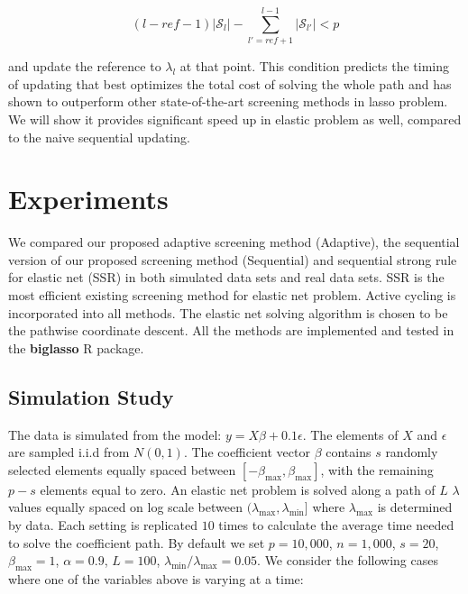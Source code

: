 \begin{equation}
    (l-ref-1)|\mathcal{S}_{l}|-\sum_{l'=ref+1}^{l-1}|\mathcal{S}_{l'}|<p
\end{equation}

and update the reference to $\lambda_l$ at that point. This condition predicts the timing of updating that best optimizes the total cost of solving the whole path and has shown to outperform other state-of-the-art screening methods in lasso problem. We will show it provides significant speed up in elastic problem as well, compared to the naive sequential updating.

\section{Experiments}

We compared our proposed adaptive screening method (Adaptive), the sequential version of our proposed screening method (Sequential) and sequential strong rule for elastic net (SSR) in both simulated data sets and real data sets. SSR is the most efficient existing screening method for elastic net problem. Active cycling is incorporated into all methods. The elastic net solving algorithm is chosen to be the pathwise coordinate descent. All the methods are implemented and tested in the \textbf{biglasso} R package.

\subsection{Simulation Study}



The data is simulated from the model: $y=X\beta+0.1\epsilon$. The elements of $X$ and $\epsilon$ are sampled i.i.d from $N(0,1)$. The coefficient vector $\beta$ contains $s$ randomly selected elements equally spaced between $[-\beta_{\max},\beta_{\max}]$, with the remaining $p-s$ elements equal to zero. An elastic net problem is solved along a path of $L$ $\lambda$ values equally spaced on log scale between $(\lambda_{\max},\lambda_{\min}]$ where $\lambda_{\max}$ is determined by data. Each setting is replicated $10$ times to calculate the average time needed to solve the coefficient path. By default we set $p=10,000$, $n=1,000$, $s=20$, $\beta_{\max}=1$, $\alpha=0.9$, $L=100$, $\lambda_{\min}/\lambda_{\max}=0.05$. We consider the following cases where one of the variables above is varying at a time:

